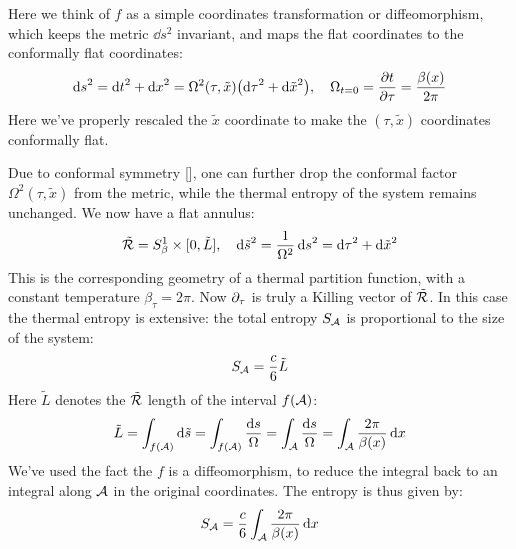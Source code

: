 \documentclass[11pt,a4paper]{article}
\begin{document}
	Here we think of $f$ as a simple coordinates transformation or diffeomorphism, which keeps the metric $\dd{s}^2$ invariant, and maps the flat coordinates to the conformally flat coordinates:
	\begin{equation}
		\dd{s}^2
		= \dd{t}^2 + \dd{x}^2
		= \Omega^2(\tau,\tilde{x}) \pqty{
				\dd{\tau}^2 + \dd{\tilde{x}}^2
			},
	\quad
		\Omega_{t = 0} = \pdv{t}{\tau}
		= \frac{\beta(x)}{2\pi}
	\end{equation}
	Here we've properly rescaled the $\tilde{x}$ coordinate to make the $(\tau,\tilde{x})$ coordinates conformally flat. 
	
	Due to conformal symmetry [], one can further drop the conformal factor $\Omega^2(\tau,\tilde{x})$ from the metric, while the thermal entropy of the system remains unchanged. We now have a flat annulus:
	\begin{equation}
		\tilde{\mathcal{R}}
		= S^1_\beta \times [0,\tilde{L}],
	\quad
		\dd{\tilde{s}}^2
		= \frac{1}{\Omega^2} \dd{s}^2
		= \dd{\tau}^2 + \dd{\tilde{x}}^2
	\end{equation}
	This is the corresponding geometry of a thermal partition function, with a constant temperature $\beta_\tau = 2\pi$. 
	Now $\partial_{\tau}$ is truly a Killing vector of $\tilde{\mathcal{R}}$. 
	In this case the thermal entropy is extensive: the total entropy $S_{\mathcal{A}}$ is proportional to the size of the system:
	\begin{equation}
		S_{\mathcal{A}}
		= \frac{c}{6} \tilde{L}
	\end{equation}
	Here $\tilde{L}$ denotes the $\tilde{\mathcal{R}}$ length of the interval $f(\mathcal{A})$:
	\begin{equation}
		\tilde{L}
		= \int_{f(\mathcal{A})} \dd{\tilde{s}}
		= \int_{f(\mathcal{A})} \frac{\dd{s}}{\Omega}
		= \int_{\mathcal{A}} \frac{\dd{s}}{\Omega}
		= \int_{\mathcal{A}} \frac{2\pi}{\beta(x)} \dd{x}
	\end{equation}
	We've used the fact the $f$ is a diffeomorphism, to reduce the integral back to an integral along $\mathcal{A}$ in the original coordinates. 
	The entropy is thus given by:
	\begin{equation}
		S_{\mathcal{A}}
		= \frac{c}{6}
			\int_{\mathcal{A}} \frac{2\pi}{\beta(x)} \dd{x}
	\end{equation}
	
\end{document}
